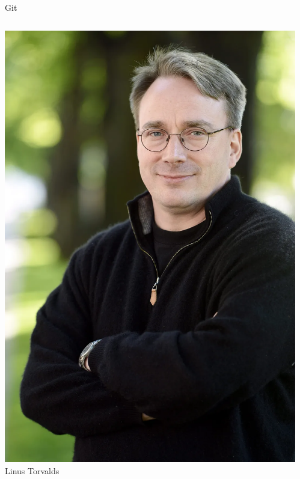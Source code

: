 \documentclass{beamer}
\begin{document}
\begin{frame}{Git}
	\begin{columns}
			\begin{center}
				\includegraphics[scale=0.1]{torvalds.jpg}\\
				Linus Torvalds
			\end{center}
			\begin{center}

\end{center}
\end{columns}
\end{frame}
\end{document}

